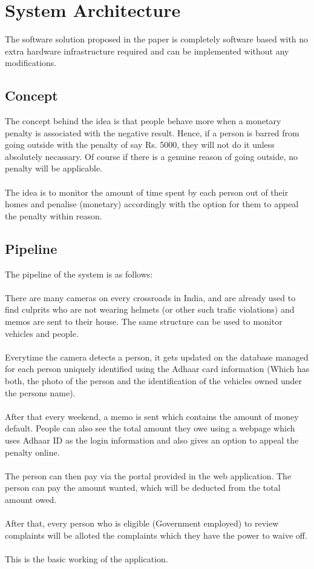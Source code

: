 \documentclass[10pt,twocolumn,letterpaper]{article}
\begin{document}
\section*{System Architecture}
The software solution proposed in the paper is completely software based with 
no extra hardware infrastructure required and can be implemented without 
any modifications.

\subsection*{Concept}
The concept behind the idea is that people behave more when a monetary penalty is 
associated with the negative result. Hence, if a person is barred from going outside 
with the penalty of say Rs. 5000, they will not do it unless absolutely necassary.
Of course if there is a genuine reason of going outside, no penalty will be applicable.
\\\\
The idea is to monitor the amount of time spent by each person out of their 
homes and penalise (monetary) accordingly with the option for them to appeal the 
penalty within reason.

\subsection*{Pipeline}
The pipeline of the system is as follows:\\\\ There are many cameras on every crossroads 
in India, and are already used to find culprits who are not wearing helmets (or 
other such trafic violations) and memos are sent to their house. The same structure 
can be used to monitor vehicles and people.\\\\ Everytime the camera detects a person, 
it gets updated on the database managed for each person uniquely identified 
using the Adhaar card  information (Which has both, the photo of the person and the 
identification of the vehicles owned under the persons name).\\\\After that every 
weekend, a memo is sent which contains the amount of money default. People can 
also see the total amount they owe using a webpage which uses Adhaar ID as the 
login information and also gives an option to appeal the penalty online. \\\\
The person can then pay via the portal provided in the web application. The 
person can pay the amount wanted, which will be deducted from the total amount 
owed.\\\\After that, every person who is eligible (Government employed) to 
review complaints will be alloted the complaints which they have the 
power to waive off.\\\\
This is the basic working of the application.
\end{document}
